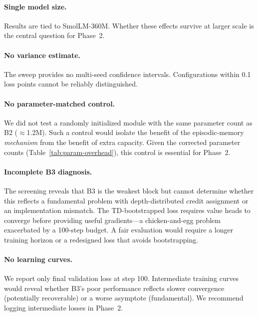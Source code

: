 \documentclass[11pt]{article}
\begin{document}
\paragraph{Single model size.}
Results are tied to SmolLM-360M.
Whether these effects survive at larger scale is the central question for
Phase~2.

\paragraph{No variance estimate.}
The sweep provides no multi-seed confidence intervals.
Configurations within 0.1 loss points cannot be reliably distinguished.

\paragraph{No parameter-matched control.}
We did not test a randomly initialized module with the same parameter count as
B2 (${\approx}$1.2M).
Such a control would isolate the benefit of the episodic-memory
\emph{mechanism} from the benefit of extra capacity.
Given the corrected parameter counts (Table~\ref{tab:param-overhead}), this
control is essential for Phase~2.

\paragraph{Incomplete B3 diagnosis.}
The screening reveals that B3 is the weakest block but cannot determine whether
this reflects a fundamental problem with depth-distributed credit assignment or
an implementation mismatch.
The TD-bootstrapped loss requires value heads to converge before providing
useful gradients---a chicken-and-egg problem exacerbated by a 100-step budget.
A fair evaluation would require a longer training horizon or a redesigned loss
that avoids bootstrapping.

\paragraph{No learning curves.}
We report only final validation loss at step 100.
Intermediate training curves would reveal whether B3's poor performance
reflects slower convergence (potentially recoverable) or a worse asymptote
(fundamental).
We recommend logging intermediate losses in Phase~2.

\end{document}
